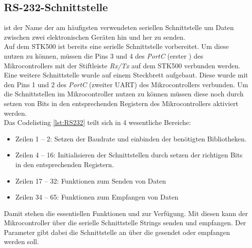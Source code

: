 \subsection{RS-232-Schnittstelle}
\label{sec:RS232}	
 ist der Name der am häufigsten verwendeten seriellen Schnittstelle um Daten zwischen zwei elektronischen Geräten hin und her zu senden. \cite{uC:RS232}\\
Auf dem STK500 ist bereits eine serielle Schnittstelle vorbereitet. Um diese nutzen zu können, müssen die Pins 3 und 4 des \emph{PortC} (erster ) des Mikrocontrollers mit der Stiftleiste \emph{Rx/Tx} auf dem STK500 verbunden werden. Eine weitere Schnittstelle wurde auf einem Steckbrett aufgebaut. Diese wurde mit den Pins 1 und 2 des \emph{PortC} (zweiter UART) des Mikrocontrollers verbunden. Um die Schnittstellen im Mikrocontroller nutzen zu können müssen diese noch durch setzen von Bits in den entsprechenden Registern des Mikrocontrollers aktiviert werden.\\
Das Codelisting \ref{lst:RS232} teilt sich in 4 wesentliche Bereiche: \\
\begin{itemize}
\item Zeilen 1 -- 2: Setzen der Baudrate und einbinden der benötigten Bibliotheken.
\item Zeilen 4 -- 16: Initialisieren der Schnittstellen durch setzen der richtigen Bits in den entsprechenden Registern.
\item Zeilen 17 -- 32: Funktionen zum Senden von Daten
\item Zeilen 34 -- 65: Funktionen zum Empfangen von Daten
\end{itemize}
\lstset{language=C, basicstyle=\footnotesize, showstringspaces=false, tabsize=8}

Damit stehen die essentiellen Funktionen  und  zur Verfügung. Mit diesen kann der Mikrocontroller über die serielle Schnittstelle Strings senden und empfangen. Der Parameter  gibt dabei die Schnittstelle an über die gesendet oder empfangen werden soll.

